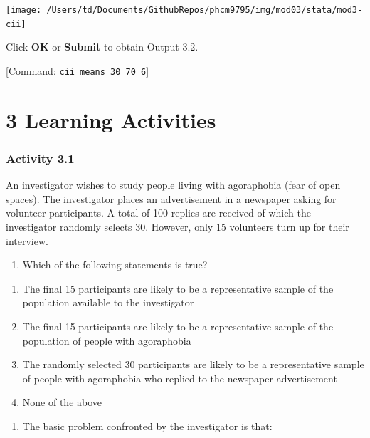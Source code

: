 \documentclass[
]{memoir}
\providecommand{\tightlist}{%
  \setlength{\itemsep}{0pt}\setlength{\parskip}{0pt}}
\begin{document}
\texttt{[image: /Users/td/Documents/GithubRepos/phcm9795/img/mod03/stata/mod3-cii]}

Click \textbf{OK} or \textbf{Submit} to obtain Output 3.2.

{[}Command: \texttt{cii\ means\ 30\ 70\ 6}{]}

\hypertarget{learning-activities-2}{%
\chapter*{\texorpdfstring{\textbf{3} Learning Activities}{3 Learning Activities}}\label{learning-activities-2}}

\hypertarget{activity-3.1}{%
\subsection*{Activity 3.1}\label{activity-3.1}}

An investigator wishes to study people living with agoraphobia (fear of open spaces). The investigator places an advertisement in a newspaper asking for volunteer participants. A total of 100 replies are received of which the investigator randomly selects 30. However, only 15 volunteers turn up for their interview.

\begin{enumerate}
\def\labelenumi{\arabic{enumi}.}
\tightlist
\item
  Which of the following statements is true?
\end{enumerate}

\begin{enumerate}
\def\labelenumi{\alph{enumi})}
\tightlist
\item
  The final 15 participants are likely to be a representative sample of the population available to the investigator
\item
  The final 15 participants are likely to be a representative sample of the population of people with agoraphobia
\item
  The randomly selected 30 participants are likely to be a representative sample of people with agoraphobia who replied to the newspaper advertisement
\item
  None of the above
\end{enumerate}

\begin{enumerate}
\def\labelenumi{\arabic{enumi}.}
\setcounter{enumi}{1}
\tightlist
\item
  The basic problem confronted by the investigator is that:
\end{enumerate}
\end{document}
